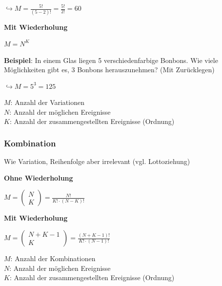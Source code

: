 $\displaystyle{
    \hookrightarrow M = \frac{5!}{(5-2)!} = \frac{5!}{2!} = 60
}$

\textbf{Mit Wiederholung}

$\displaystyle{
    M = N^{K}
}$

\textbf{Beispiel}: In einem Glas liegen 5 verschiedenfarbige Bonbons. Wie viele Möglichkeiten gibt es, 3
Bonbons herauszunehmen? (Mit Zurücklegen)

$\displaystyle{
    \hookrightarrow M = 5^3 = 125
}$

$M$: Anzahl der Variationen\\
$N$: Anzahl der möglichen Ereignisse\\
$K$: Anzahl der zusammengestellten Ereignisse (Ordnung)

\subsubsection{Kombination}

Wie Variation, Reihenfolge aber irrelevant (vgl. Lottoziehung)

\textbf{Ohne Wiederholung}

$\displaystyle{
    M = \begin{pmatrix}
        N\\
        K
    \end{pmatrix}
    = \frac{N!}{K! \cdot (N - K)!}
}$

\textbf{Mit Wiederholung}

$\displaystyle{
    M = \begin{pmatrix}
        N + K - 1\\
        K
    \end{pmatrix} 
    = \frac{(N + K - 1)!}{K! \cdot (N - 1)!}
}$

$M$: Anzahl der Kombinationen\\
$N$: Anzahl der möglichen Ereignisse\\
$K$: Anzahl der zusammengestellten Ereignisse (Ordnung)